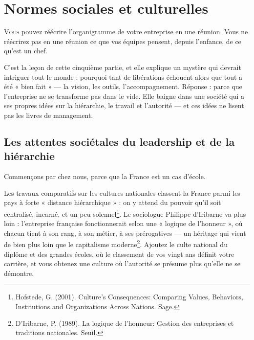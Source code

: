 
\chapter{Normes sociales et culturelles}

\lettrine[lines=2]{V}{ous} pouvez réécrire l'organigramme de votre entreprise en une réunion. Vous ne réécrirez pas en une réunion ce que vos équipes pensent, depuis l'enfance, de ce qu'est un chef.

C'est la leçon de cette cinquième partie, et elle explique un mystère qui devrait intriguer tout le monde : pourquoi tant de libérations échouent alors que tout a été « bien fait » — la vision, les outils, l'accompagnement. Réponse : parce que l'entreprise ne se transforme pas dans le vide. Elle baigne dans une société qui a ses propres idées sur la hiérarchie, le travail et l'autorité — et ces idées ne lisent pas les livres de management.

\section{Les attentes sociétales du leadership et de la hiérarchie}

Commençons par chez nous, parce que la France est un cas d'école.

Les travaux comparatifs sur les cultures nationales classent la France parmi les pays à forte « distance hiérarchique » : on y attend du pouvoir qu'il soit centralisé, incarné, et un peu solennel\footnote{Hofstede, G. (2001). Culture's Consequences: Comparing Values, Behaviors, Institutions and Organizations Across Nations. Sage.}. Le sociologue Philippe d'Iribarne va plus loin : l'entreprise française fonctionnerait selon une « logique de l'honneur », où chacun tient à son rang, à son métier, à ses prérogatives — un héritage qui vient de bien plus loin que le capitalisme moderne\footnote{D'Iribarne, P. (1989). La logique de l'honneur: Gestion des entreprises et traditions nationales. Seuil.}. Ajoutez le culte national du diplôme et des grandes écoles, où le classement de vos vingt ans définit votre carrière, et vous obtenez une culture où l'autorité se présume plus qu'elle ne se démontre.

